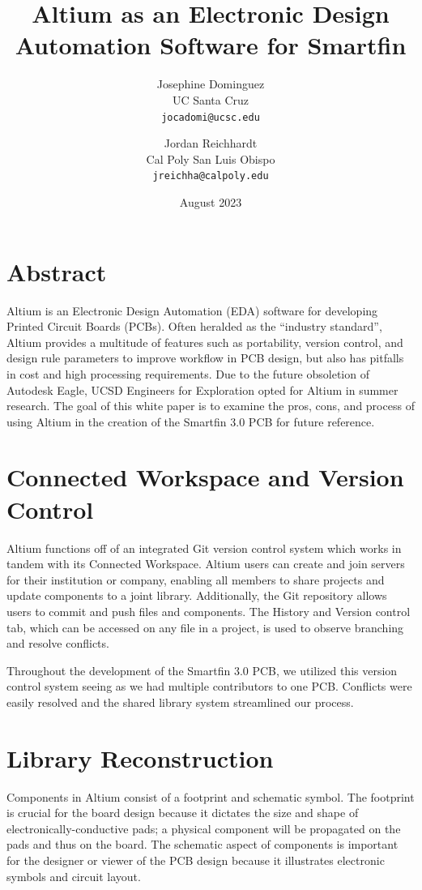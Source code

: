 \documentclass[twocolumn]{article}
\title{Altium as an Electronic Design Automation Software for Smartfin}
\author{
  Josephine Dominguez\\
  UC Santa Cruz\\
  \texttt{jocadomi@ucsc.edu}
  \and
  Jordan Reichhardt\\
  Cal Poly San Luis Obispo\\
  \texttt{jreichha@calpoly.edu}
}
\date{August 2023}
\begin{document}
\maketitle

\section*{Abstract}
Altium is an Electronic Design Automation (EDA) software for developing Printed Circuit Boards (PCBs). Often heralded as the “industry standard”, Altium provides a multitude of features such as portability, version control, and design rule parameters to improve workflow in PCB design, but also has pitfalls in cost and high processing requirements. Due to the future obsoletion of Autodesk Eagle, UCSD Engineers for Exploration opted for Altium in summer research. The goal of this white paper is to examine the pros, cons, and process of using Altium in the creation of the Smartfin 3.0 PCB for future reference.

\section{Connected Workspace and Version Control}
Altium functions off of an integrated Git version control system which works in tandem with its Connected Workspace. Altium users can create and join servers for their institution or company, enabling all members to share projects and update components to a joint library. Additionally, the Git repository allows users to commit and push files and components. The History and Version control tab, which can be accessed on any file in a project, is used to observe branching and resolve conflicts. 

Throughout the development of the Smartfin 3.0 PCB, we utilized this version control system seeing as we had multiple contributors to one PCB. Conflicts were easily resolved and the shared library system streamlined our process.

\section{Library Reconstruction}

Components in Altium consist of a footprint and schematic symbol. The footprint is crucial for the board design because it dictates the size and shape of electronically-conductive pads; a physical component will be propagated on the pads and thus on the board. The schematic aspect of components is important for the designer or viewer of the PCB design because it illustrates electronic symbols and circuit layout. 
\end{document}
